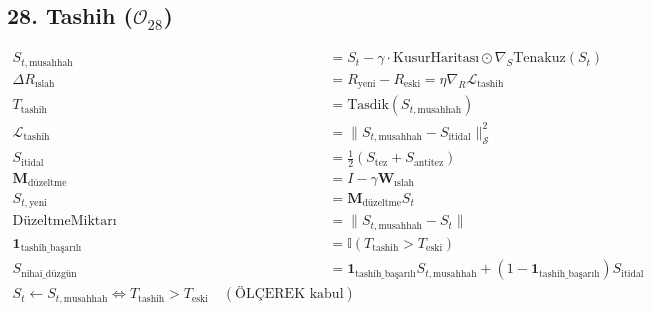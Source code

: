 \documentclass[11pt, a4paper]{article}
\begin{document}
\subsection{28. Tashih ($\mathcal{O}_{28}$)}
\begin{align}
S_{t, \text{musahhah}} &= S_t - \gamma \cdot \text{KusurHaritası} \odot \nabla_{S} \text{Tenakuz}(S_t) \\
\Delta R_{\text{ıslah}} &= R_{\text{yeni}} - R_{\text{eski}} = \eta \nabla_R \mathcal{L}_{\text{tashih}} \\
T_{\text{tashih}} &= \text{Tasdik}(S_{t, \text{musahhah}}) \\
\mathcal{L}_{\text{tashih}} &= \| S_{t, \text{musahhah}} - S_{\text{itidal}} \|_{\mathcal{S}}^2 \\
S_{\text{itidal}} &= \frac{1}{2} (S_{\text{tez}} + S_{\text{antitez}}) \\
\mathbf{M}_{\text{düzeltme}} &= I - \gamma \mathbf{W}_{\text{ıslah}} \\
S_{t, \text{yeni}} &= \mathbf{M}_{\text{düzeltme}} S_t \\
\text{DüzeltmeMiktarı} &= \|S_{t, \text{musahhah}} - S_t\| \\
\mathbf{1}_{\text{tashih\_başarılı}} &= \mathbb{I}(T_{\text{tashih}} > T_{\text{eski}}) \\
S_{\text{nihai\_düzgün}} &= \mathbf{1}_{\text{tashih\_başarılı}} S_{t, \text{musahhah}} + (1 - \mathbf{1}_{\text{tashih\_başarılı}}) S_{\text{itidal}} \\
S_t \leftarrow S_{t,\text{musahhah}} \iff T_{\text{tashih}} > T_{\text{eski}} \quad (\text{ÖLÇEREK kabul})
\end{align}
\end{document}
